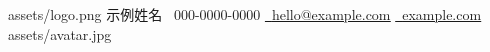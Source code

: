 \resumeHeader
  {assets/logo.png}
  {示例姓名}
  {~000-0000-0000 \hspace{1.5em}
   \href{mailto:hello@example.com}{~\uline{hello@example.com}} \hspace{1.5em}
   \href{https://example.com}{~\uline{example.com}}}
  {assets/avatar.jpg}
